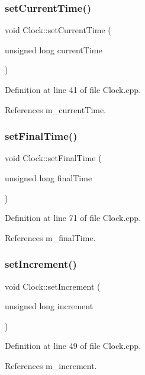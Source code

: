 \subsubsection{setCurrentTime()}
{\footnotesize\ttfamily void Clock\+::set\+Current\+Time (\begin{DoxyParamCaption}\item[{unsigned long}]{current\+Time }\end{DoxyParamCaption})}



Definition at line 41 of file Clock.\+cpp.



References m\+\_\+current\+Time.

\mbox{\label{class_clock_a4780f83b55bc2539cd7069cfc4f06d99}} 
\subsubsection{setFinalTime()}
{\footnotesize\ttfamily void Clock\+::set\+Final\+Time (\begin{DoxyParamCaption}\item[{unsigned long}]{final\+Time }\end{DoxyParamCaption})}



Definition at line 71 of file Clock.\+cpp.



References m\+\_\+final\+Time.

\mbox{\label{class_clock_a1ae60dca4e41f6e27d6104ec618c02f1}} 
\subsubsection{setIncrement()}
{\footnotesize\ttfamily void Clock\+::set\+Increment (\begin{DoxyParamCaption}\item[{unsigned long}]{increment }\end{DoxyParamCaption})}



Definition at line 49 of file Clock.\+cpp.



References m\+\_\+increment.

\mbox{\label{class_clock_abe7fb8f715d0dcae08e52b2b7aed7db2}} 
